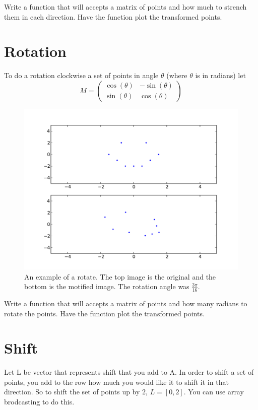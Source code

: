 \begin{problem}
Write a function that will accepts a matrix of points and how much to strench them in each direction. Have the function plot the transformed points.
\end{problem}

\section*{Rotation}
To do a rotation clockwise a set of points in angle $\theta$ (where $\theta$ is in radians) let
\[
M = \begin{pmatrix}
\cos(\theta) & -\sin(\theta) \\
\sin(\theta) & \cos(\theta) 
\end{pmatrix}
\]

\begin{figure}[H]
\includegraphics[scale = .5]{rotate.pdf}
\caption{An example of a rotate. The top image is the original and the bottom is the motified image. The rotation angle was $\frac{3\pi}{16}$.}
\end{figure}

\begin{problem}
Write a function that will accepts a matrix of points and how many radians to rotate the points. Have the function plot the transformed points.
\end{problem}

\section*{Shift}
Let L be vector that represents shift that you add to A. In order to shift a set of points, you add to the row how much you would like it to shift it in that direction. So to shift the set of points up by 2, $L=[0,2]$. You can use array brodcasting to do this.

